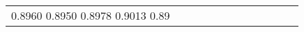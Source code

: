 \documentclass[runningheads]{llncs}
\begin{document}
\begin{table}[!ht]
\begin{tabular}{|p{7em}|p{2.5em}|p{2.5em}|p{3em}|p{2.5em}|p{3em}|p{2.5em}|p{3em}|p{2.5em}|p{3em}|p{2.5em}|p{3em}|}
\newline{}0.8960 \newline{}0.8950 \newline{}0.8978 \newline{}0.9013 \newline{}0.89
\end{tabular}
\end{table}
\end{document}
